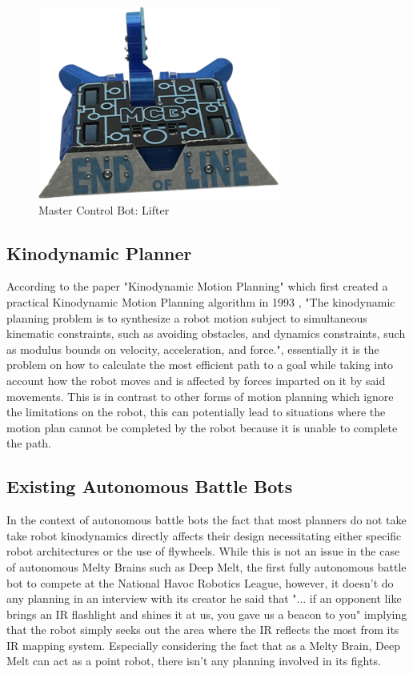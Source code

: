 \documentclass[conference]{IEEEtran}
\begin{document}
\begin{figure}[htp]
\centering
\includegraphics[scale=0.4]{mcbmastercontrolbot.png}
\caption{Master Control Bot: Lifter \cite{b2}}
\label{Master Control Bot: Lifter}
\end{figure}

\newpage

\subsection{Kinodynamic Planner}
According to the paper "Kinodynamic Motion Planning" which first created a practical Kinodynamic Motion Planning algorithm in 1993 \cite{b3}, "The kinodynamic planning problem is to synthesize a robot motion subject to simultaneous kinematic constraints, such as avoiding obstacles, and dynamics constraints, such as modulus bounds on velocity, acceleration, and force."\cite{b3}, essentially it is the problem on how to calculate the most efficient path to a goal while taking into account how the robot moves and is affected by forces imparted on it by said movements.  This is in contrast to other forms of motion planning which ignore the limitations on the robot, this can potentially lead to situations where the motion plan cannot be completed by the robot because it is unable to complete the path.  

\subsection{Existing Autonomous Battle Bots}

In the context of autonomous battle bots the fact that most planners do not take take robot kinodynamics directly affects their design necessitating either specific robot architectures or the use of flywheels.  While this is not an issue in the case of autonomous Melty Brains such as Deep Melt, the first fully autonomous battle bot to compete at the National Havoc Robotics League, however, it doesn't do any planning in an interview with its creator he said that "... if an opponent like brings an IR flashlight and shines it at us, you gave us a beacon to you"\cite{b5} implying that the robot simply seeks out the area where the IR reflects the most from its IR mapping system.  Especially considering the fact that as a Melty Brain, Deep Melt can act as a point robot, there isn't any planning involved in its fights.
\end{document}
